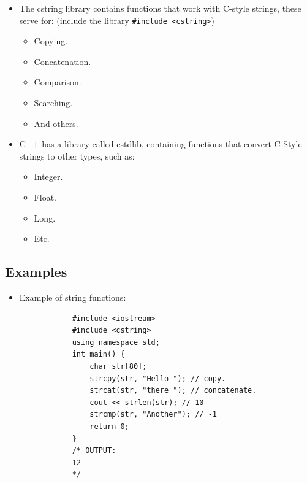 \begin{itemize}
    \item The cstring library contains functions that work with C-style strings, these serve for: (include the library \texttt{#include <cstring>})
        \begin{itemize}
            \item Copying.
            \item Concatenation.
            \item Comparison.
            \item Searching.
            \item And others.
        \end{itemize}
    
    \item C++ has a library called cstdlib, containing functions that convert C-Style strings to other types, such as:
        \begin{itemize}
            \item Integer.
            \item Float.
            \item Long.
            \item Etc.
        \end{itemize}
\end{itemize}

\subsection{Examples}
\begin{itemize}
    \item Example of string functions:
        \begin{verbatim}
            #include <iostream>
            #include <cstring>
            using namespace std;
            int main() {
                char str[80];
                strcpy(str, "Hello "); // copy.
                strcat(str, "there "); // concatenate.
                cout << strlen(str); // 10
                strcmp(str, "Another"); // -1
                return 0;
            }
            /* OUTPUT:
            12
            */
        \end{verbatim}
\end{itemize}


